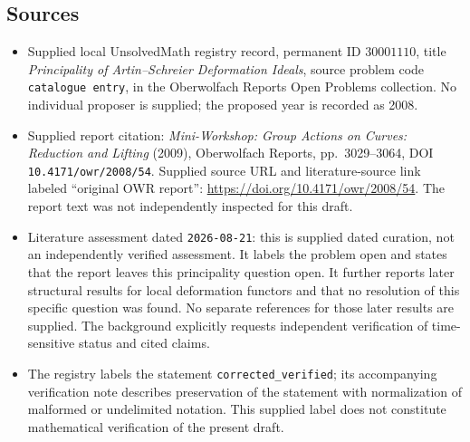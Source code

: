 \documentclass[11pt]{article}
\begin{document}
\subsection{Sources}
\begin{itemize}
\item Supplied local UnsolvedMath registry record, permanent ID \(30001110\), title \emph{Principality of Artin--Schreier Deformation Ideals}, source problem code \texttt{catalogue entry}, in the Oberwolfach Reports Open Problems collection. No individual proposer is supplied; the proposed year is recorded as 2008.
\item Supplied report citation: \emph{Mini-Workshop: Group Actions on Curves: Reduction and Lifting} (2009), Oberwolfach Reports, pp.~3029--3064, DOI \texttt{10.4171/owr/2008/54}. Supplied source URL and literature-source link labeled ``original OWR report'': \url{https://doi.org/10.4171/owr/2008/54}. The report text was not independently inspected for this draft.
\item Literature assessment dated \texttt{2026-08-21}: this is supplied dated curation, not an independently verified assessment. It labels the problem open and states that the report leaves this principality question open. It further reports later structural results for local deformation functors and that no resolution of this specific question was found. No separate references for those later results are supplied. The background explicitly requests independent verification of time-sensitive status and cited claims.
\item The registry labels the statement \texttt{corrected\_verified}; its accompanying verification note describes preservation of the statement with normalization of malformed or undelimited notation. This supplied label does not constitute mathematical verification of the present draft.
\end{itemize}
\end{document}
